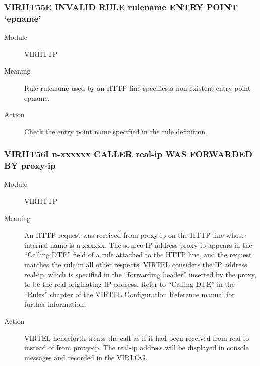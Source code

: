 \documentclass[letterpaper,10pt,english]{sphinxmanual}
\begin{document}
\subsubsection{VIRHT55E INVALID RULE rulename ENTRY POINT ‘epname’}
\label{\detokenize{messages:virht55e-invalid-rule-rulename-entry-point-epname}}\begin{description}
\item[{Module}] \leavevmode
VIRHTTP

\item[{Meaning}] \leavevmode
Rule rulename used by an HTTP line specifies a non-existent entry point epname.

\item[{Action}] \leavevmode
Check the entry point name specified in the rule definition.

\end{description}


\subsubsection{VIRHT56I n-xxxxxx CALLER real-ip WAS FORWARDED BY proxy-ip}
\label{\detokenize{messages:virht56i-n-xxxxxx-caller-real-ip-was-forwarded-by-proxy-ip}}\begin{description}
\item[{Module}] \leavevmode
VIRHTTP

\item[{Meaning}] \leavevmode
An HTTP request was received from proxy-ip on the HTTP line whose internal name is n-xxxxxx. The source IP address proxy-ip appears in the “Calling DTE” field of a rule attached to the HTTP line, and the request matches the rule in all other respects. VIRTEL considers the IP address real-ip, which is specified in the “forwarding header” inserted by the proxy, to be the real originating IP address. Refer to “Calling DTE” in the “Rules” chapter of the VIRTEL Configuration Reference manual for further information.

\item[{Action}] \leavevmode
VIRTEL henceforth treats the call as if it had been received from real-ip instead of from proxy-ip. The real-ip address will be displayed in console messages and recorded in the VIRLOG.

\end{description}
\end{document}
